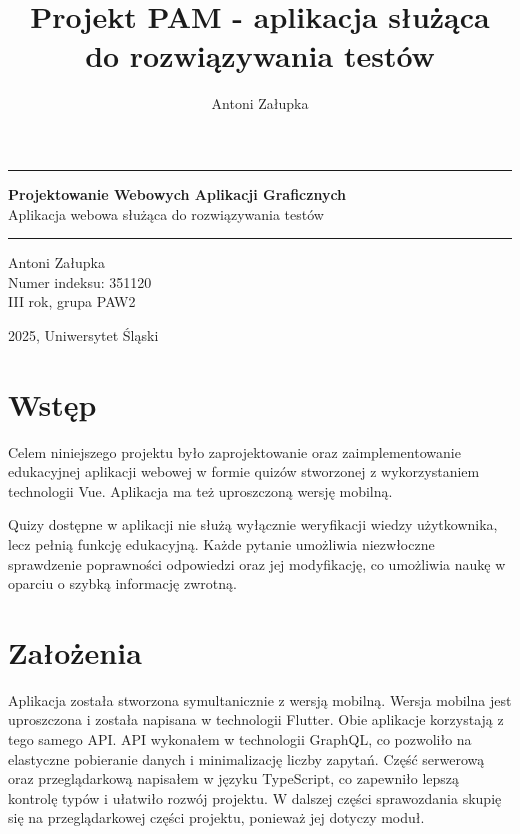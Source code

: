 \documentclass{article}
\title{Projekt PAM - aplikacja służąca do rozwiązywania testów}
\author{Antoni Załupka}
\begin{document}
	\thispagestyle{empty}
	
	
	\vspace{4cm}
	
	\rule{\linewidth}{2mm} 
	
	\begin{center}
		\huge \textbf{Projektowanie Webowych Aplikacji Graficznych} \\
		\huge {Aplikacja webowa służąca do rozwiązywania testów} \\
	\end{center}
	
	\rule{\linewidth}{0.5mm} 
	
	\vspace{2cm}
	
	\begin{center}
		\Large{Antoni Załupka} \\
		\Large{Numer indeksu: 351120} \\
		\Large{III rok, grupa PAW2} \\
		
	\end{center}
	
	
	\vspace{14cm}
	
	\begin{center}
		\Large{2025, Uniwersytet Śląski}
	\end{center}
	
	\newpage
	
	\tableofcontents
	
	\newpage
	
	\section{Wstęp}
	Celem niniejszego projektu było zaprojektowanie oraz zaimplementowanie edukacyjnej aplikacji webowej w formie quizów stworzonej z wykorzystaniem technologii Vue. Aplikacja ma też uproszczoną wersję mobilną. 
	
	Quizy dostępne w aplikacji nie służą wyłącznie weryfikacji wiedzy użytkownika, lecz pełnią funkcję edukacyjną. Każde pytanie umożliwia niezwłoczne sprawdzenie poprawności odpowiedzi oraz jej modyfikację, co umożliwia naukę w oparciu o szybką informację zwrotną.

    \section{Założenia}
    Aplikacja została stworzona symultanicznie z wersją mobilną. 
        Wersja mobilna jest uproszczona i została napisana w technologii Flutter.
        Obie aplikacje korzystają z tego samego API. 
        API wykonałem w technologii GraphQL, co pozwoliło na elastyczne pobieranie danych i minimalizację liczby zapytań.
        Część serwerową oraz przeglądarkową napisałem w języku TypeScript, co zapewniło lepszą kontrolę typów i ułatwiło rozwój projektu.
        W dalszej części sprawozdania skupię się na przeglądarkowej części projektu, ponieważ jej dotyczy moduł.
\end{document}

